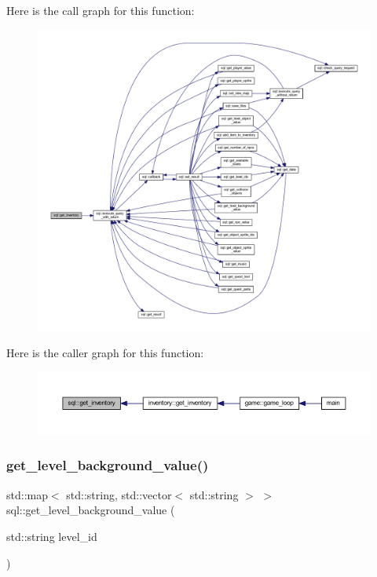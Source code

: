 Here is the call graph for this function\+:
\nopagebreak
\begin{figure}[H]
\begin{center}
\leavevmode
\includegraphics[width=350pt]{classsql_a7f818b967453b1ae15ce4c5b28cf4765_cgraph}
\end{center}
\end{figure}
Here is the caller graph for this function\+:
\nopagebreak
\begin{figure}[H]
\begin{center}
\leavevmode
\includegraphics[width=350pt]{classsql_a7f818b967453b1ae15ce4c5b28cf4765_icgraph}
\end{center}
\end{figure}
\mbox{\label{classsql_a5eb7fea00a56fe6ba33f602871798bc8}} 
\subsubsection{\texorpdfstring{get\+\_\+level\+\_\+background\+\_\+value()}{get\_level\_background\_value()}}
{\footnotesize\ttfamily std\+::map$<$ std\+::string, std\+::vector$<$ std\+::string $>$ $>$ sql\+::get\+\_\+level\+\_\+background\+\_\+value (\begin{DoxyParamCaption}\item[{std\+::string}]{level\+\_\+id }\end{DoxyParamCaption})}



